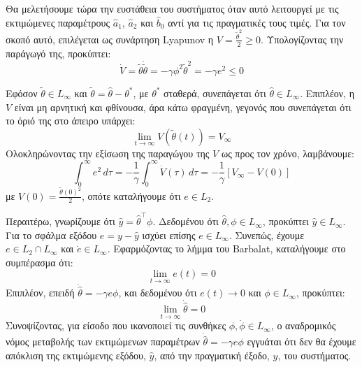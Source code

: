 \documentclass[12pt]{article} %
\numberwithin{equation}{section}  %
\begin{document}
Θα μελετήσουμε τώρα την ευστάθεια του συστήματος όταν αυτό λειτουργεί με τις εκτιμώμενες παραμέτρους $\hat{a}_1$, $\hat{a}_2$ και $\hat{b}_0$ αντί για τις πραγματικές τους τιμές. 
Για τον σκοπό αυτό, επιλέγεται ως συνάρτηση Lyapunov η $ V = \frac{\tilde{\theta}^2}{2} \geq 0 $. Υπολογίζοντας την παράγωγό της, προκύπτει:
\vspace{-\topsep}
\vspace{+3pt}
\[
\dot{V} = \tilde{\theta} \dot{\tilde{\theta}} = -\gamma \phi^2 \tilde{\theta}^2 = -\gamma e^2 \leq 0
\]

Εφόσον $ \tilde{\theta} \in L_\infty $ και $ \tilde{\theta} = \hat{\theta} - \theta^* $, με $ \theta^* $ σταθερά, συνεπάγεται ότι $ \hat{\theta} \in L_\infty $. Επιπλέον, η $ V $ είναι μη αρνητική και φθίνουσα, άρα κάτω φραγμένη, γεγονός που συνεπάγεται ότι το όριό της στο άπειρο υπάρχει:
\vspace{-\topsep}
\vspace{+3pt}
\[
\lim_{t \to \infty} V(\tilde{\theta}(t)) = V_\infty
\]
Ολοκληρώνοντας την εξίσωση της παραγώγου της $ V $ ως προς τον χρόνο, λαμβάνουμε:
\vspace{-\topsep}
\vspace{+3pt}
\[
\int_0^\infty e^2 \, d\tau = -\frac{1}{\gamma} \int_0^\infty \dot{V}(\tau) \, d\tau = -\frac{1}{\gamma} [V_\infty - V(0)]
\]
με $ V(0) = \frac{\tilde{\theta}(0)^2}{2} $, οπότε καταλήγουμε ότι $ e \in L_2 $.

Περαιτέρω, γνωρίζουμε ότι $ \hat{y} = \hat{\theta}^{\top} \phi $. Δεδομένου ότι $ \hat{\theta}, \phi \in L_\infty $, προκύπτει $ \hat{y} \in L_\infty $. Για το σφάλμα εξόδου $ e = y - \hat{y} $ ισχύει επίσης $ e \in L_\infty $. Συνεπώς, έχουμε $ e \in L_2 \cap L_\infty $ και $ \dot{e} \in L_\infty $. Εφαρμόζοντας το λήμμα του Barbalat, καταλήγουμε στο συμπέρασμα ότι:
\vspace{-\topsep}
\vspace{+3pt}
\[
\lim_{t \to \infty} e(t) = 0
\]
Επιπλέον, επειδή $ \dot{\hat{\theta}} = -\gamma e \phi $, και δεδομένου ότι $ e(t) \to 0 $ και $ \phi \in L_\infty $, προκύπτει:
\vspace{-\topsep}
\vspace{+3pt}
\[
\lim_{t \to \infty} \dot{\hat{\theta}} = 0
\]
Συνοψίζοντας, για είσοδο που ικανοποιεί τις συνθήκες $ \phi, \dot{\phi} \in L_\infty $, ο αναδρομικός νόμος μεταβολής των εκτιμώμενων παραμέτρων $ \dot{\hat{\theta}} = -\gamma e \phi $ εγγυάται ότι δεν θα έχουμε απόκλιση της εκτιμώμενης εξόδου, $ \hat{y} $, από την πραγματική έξοδο, $ y $, του συστήματος.
\end{document}
